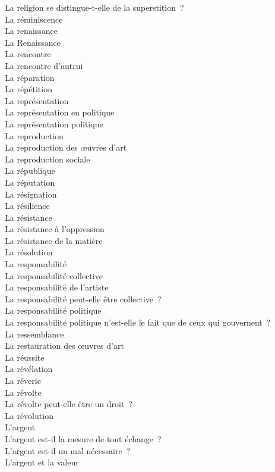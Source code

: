 \documentclass[a4paper,12pt]{article}
\begin{document}
La religion se distingue-t-elle de la superstition ? \\
La réminiscence \\
La renaissance \\
La Renaissance \\
La rencontre \\
La rencontre d'autrui \\
La réparation \\
La répétition \\
La représentation \\
La représentation en politique \\
La représentation politique \\
La reproduction \\
La reproduction des œuvres d'art \\
La reproduction sociale \\
La république \\
La réputation \\
La résignation \\
La résilience \\
La résistance \\
La résistance à l'oppression \\
La résistance de la matière \\
La résolution \\
La responsabilité \\
La responsabilité collective \\
La responsabilité de l'artiste \\
La responsabilité peut-elle être collective ? \\
La responsabilité politique \\
La responsabilité politique n'est-elle le fait que de ceux qui gouvernent ? \\
La ressemblance \\
La restauration des œuvres d'art \\
La réussite \\
La révélation \\
La rêverie \\
La révolte \\
La révolte peut-elle être un droit ? \\
La révolution \\
L'argent \\
L'argent est-il la mesure de tout échange ? \\
L'argent est-il un mal nécessaire ? \\
L'argent et la valeur \\
\end{document}
